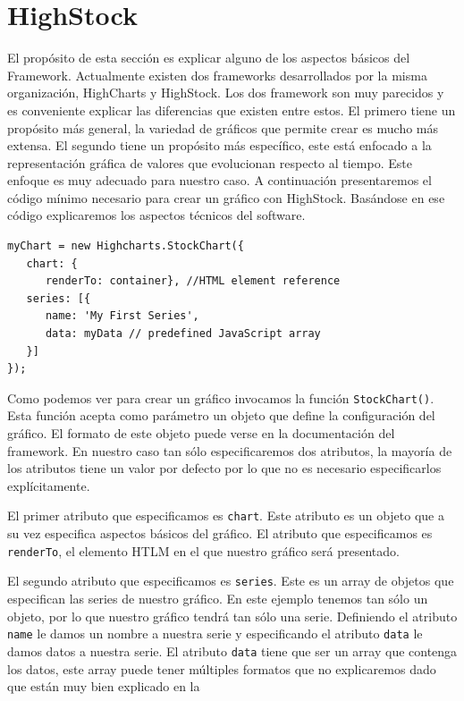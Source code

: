 \section{HighStock}
	El propósito de esta sección es explicar alguno de los aspectos básicos del Framework. Actualmente existen dos frameworks desarrollados por la
	misma organización, HighCharts y HighStock. Los dos framework son muy parecidos y es conveniente explicar las diferencias que existen entre
	estos. El primero tiene un propósito más general, la variedad de gráficos que permite crear es mucho más extensa. El segundo tiene un
	propósito más específico, este está enfocado a la representación gráfica de valores que evolucionan respecto al tiempo. Este enfoque es muy
	adecuado para nuestro caso. A continuación presentaremos el código mínimo necesario para crear un gráfico con HighStock. Basándose en ese
	código explicaremos los aspectos técnicos del software.
	\begin{lstlisting}[style=myJs]
myChart = new Highcharts.StockChart({
   chart: {
      renderTo: container}, //HTML element reference
   series: [{
      name: 'My First Series',
      data: myData // predefined JavaScript array
   }]
});
	\end{lstlisting}
	\par
	Como podemos ver para crear un gráfico invocamos la función \texttt{StockChart()}. Esta función acepta como parámetro un objeto que
	define la configuración del gráfico. El formato de este objeto puede verse en la documentación del framework\cite{HighStockDoc}. En nuestro
	caso tan sólo especificaremos dos atributos, la mayoría de los atributos tiene un valor por defecto por lo que no es necesario especificarlos
	explícitamente. 
	\par
	El primer atributo que especificamos es \texttt{chart}. Este atributo es un objeto que a su vez especifica  aspectos básicos del gráfico. El
	atributo que especificamos es \texttt{renderTo}, el elemento HTLM en el que nuestro gráfico será presentado.
	\par
	El segundo atributo que especificamos es \texttt{series}. Este es un array de objetos que especifican las series de nuestro gráfico. En este
	ejemplo tenemos tan sólo un objeto, por lo que nuestro gráfico tendrá tan sólo una serie.  Definiendo el atributo \texttt{name} le damos un
	nombre a nuestra serie y especificando el atributo \texttt{data} le damos datos a nuestra serie. El atributo \texttt{data} tiene que ser un
	array que contenga los datos, este array puede tener múltiples formatos que no explicaremos dado que están muy bien explicado en la
